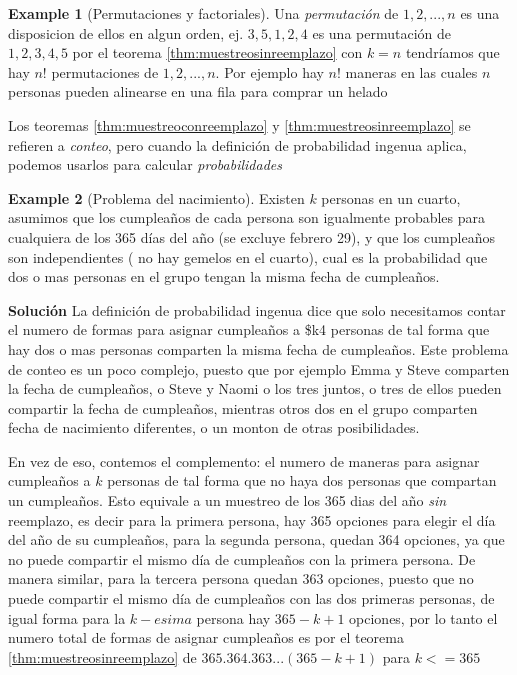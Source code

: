 \documentclass[
]{book}
\theoremstyle{definition}
\theoremstyle{definition}
\newtheorem{example}{Example}[chapter]
\theoremstyle{definition}
\theoremstyle{definition}
\theoremstyle{remark}
\begin{document}
\begin{example}[Permutaciones y factoriales]
\protect\hypertarget{exm:permutaciones}{}\label{exm:permutaciones}Una \emph{permutación} de \(1,2,...,n\) es una disposicion de ellos en algun orden, ej. \(3,5,1,2,4\) es una permutación de \(1,2,3,4,5\) por el teorema \ref{thm:muestreosinreemplazo} con \(k=n\) tendríamos que hay \(n!\) permutaciones de \(1,2,...,n\). Por ejemplo hay \(n!\) maneras en las cuales \(n\) personas pueden alinearse en una fila para comprar un helado
\end{example}

Los teoremas \ref{thm:muestreoconreemplazo} y \ref{thm:muestreosinreemplazo} se refieren a \emph{conteo}, pero cuando la definición de probabilidad ingenua aplica, podemos usarlos para calcular \emph{probabilidades}

\begin{example}[Problema del nacimiento]
\protect\hypertarget{exm:problemanacimiento}{}\label{exm:problemanacimiento}Existen \(k\) personas en un cuarto, asumimos que los cumpleaños de cada persona son igualmente probables para cualquiera de los 365 días del año (se excluye febrero 29), y que los cumpleaños son independientes ( no hay gemelos en el cuarto), cual es la probabilidad que dos o mas personas en el grupo tengan la misma fecha de cumpleaños.
\end{example}

\textbf{Solución}
La definición de probabilidad ingenua dice que solo necesitamos contar el numero de formas para asignar cumpleaños a \$k4 personas de tal forma que hay dos o mas personas comparten la misma fecha de cumpleaños. Este problema de conteo es un poco complejo, puesto que por ejemplo Emma y Steve comparten la fecha de cumpleaños, o Steve y Naomi o los tres juntos, o tres de ellos pueden compartir la fecha de cumpleaños, mientras otros dos en el grupo comparten fecha de nacimiento diferentes, o un monton de otras posibilidades.

En vez de eso, contemos el complemento: el numero de maneras para asignar cumpleaños a \(k\) personas de tal forma que no haya dos personas que compartan un cumpleaños. Esto equivale a un muestreo de los 365 dias del año \emph{sin} reemplazo, es decir para la primera persona, hay 365 opciones para elegir el día del año de su cumpleaños, para la segunda persona, quedan 364 opciones, ya que no puede compartir el mismo día de cumpleaños con la primera persona. De manera similar, para la tercera persona quedan 363 opciones, puesto que no puede compartir el mismo día de cumpleaños con las dos primeras personas, de igual forma para la \(k-esima\) persona hay \(365-k+1\) opciones, por lo tanto el numero total de formas de asignar cumpleaños es por el teorema \ref{thm:muestreosinreemplazo} de \(365.364.363...(365-k+1)\) para \(k<=365\)
\end{document}
